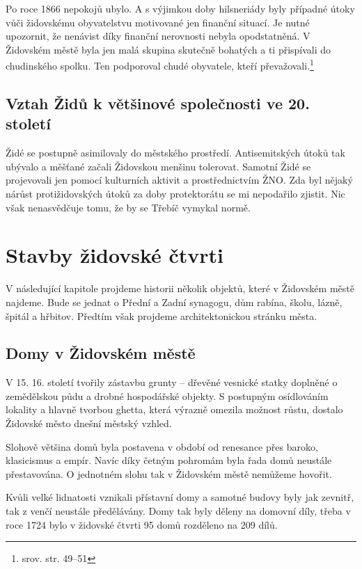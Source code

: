 \documentclass[a4paper,oneside,12pt]{report}
\begin{document}
Po roce 1866 nepokojů ubylo.
A s výjimkou doby hilsneriády byly případné útoky vůči židovskému obyvatelstvu motivované jen finanční situací.
Je nutné upozornit, že nenávist díky finanční nerovnosti nebyla opodstatněná.
V Židovském městě byla jen malá skupina skutečně bohatých a ti přispívali do chudinského spolku.
Ten podporoval chudé obyvatele, kteří převažovali.\footnote{srov. \cite{Svobodva2015} str. 49--51}

\section{Vztah Židů k většinové společnosti ve 20. století}

Židé se postupně asimilovaly do městského prostředí.
Antisemitských útoků tak ubývalo a měšťané začali Židovskou menšinu tolerovat.
Samotní Židé se projevovali jen pomocí kulturních aktivit a prostřednictvím ŽNO.
Zda byl nějaký nárůst protižidovských útoků za doby protektorátu se mi nepodařilo zjistit.
Nic však nenasvědčuje tomu, že by se Třebíč vymykal normě.


\chapter{Stavby židovské čtvrti}

V následující kapitole projdeme historii několik objektů, které v Židovském městě najdeme.
Bude se jednat o Přední a Zadní synagogu, dům rabína, školu, lázně, špitál a hřbitov.
Předtím však projdeme architektonickou stránku města.

\section{Domy v Židovském městě}

V 15. 16. století tvořily zástavbu grunty -- dřevěné vesnické statky doplněné o zemědělskou půdu a drobné hospodářské objekty.
S postupným osídlováním lokality a hlavně tvorbou ghetta, která výrazně omezila možnost růstu, dostalo Židovské město dnešní městský vzhled.

Slohově většina domů byla postavena v období od renesance přes baroko, klasicismus a empír.
Navíc díky četným pohromám byla řada domů neustále přestavována.
O jednotném slohu tak v Židovském městě nemůžeme hovořit.

Kvůli velké lidnatosti vznikali přístavní domy a samotné budovy byly jak zevnitř, tak z venčí neustále předělávány.
Domy tak byly děleny na domovní díly, třeba v roce 1724 bylo v židovské čtvrti 95 domů rozděleno na 209 dílů.
\end{document}
